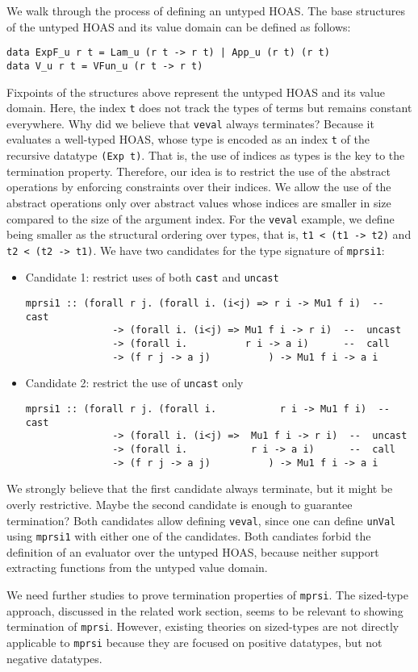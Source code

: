 We walk through the process of defining an untyped HOAS.
The base structures of the untyped HOAS and its value domain
can be defined as follows:
\begin{lstlisting}
data ExpF_u r t = Lam_u (r t -> r t) | App_u (r t) (r t)
data V_u r t = VFun_u (r t -> r t)
\end{lstlisting}
Fixpoints of the structures above represent the untyped HOAS and
its value domain. Here, the index \lstinline{t} does not track
the types of terms but remains constant everywhere.
Why did we believe that \lstinline{veval} always terminates?
Because it evaluates a well-typed HOAS, whose type is encoded as
an index \lstinline{t} of the recursive datatype \lstinline{(Exp t)}. That is,
the use of indices as types is the key to the termination property.
Therefore, our idea is to restrict the use of the abstract operations
by enforcing constraints over their indices. We allow the use
of the abstract operations only over abstract values whose indices are
smaller in size compared to the size of the argument index.
For the \lstinline{veval} example, we define being smaller as
the structural ordering over types, that is, \lstinline{t1 < (t1 -> t2)}
and \lstinline{t2 < (t2 -> t1)}.
We have two candidates for the type signature of \lstinline{mprsi1}:
\begin{itemize}
\item Candidate 1: restrict uses of both \lstinline{cast} and \lstinline{uncast}
\begin{lstlisting}
mprsi1 :: (forall r j. (forall i. (i<j) => r i -> Mu1 f i)  --  cast
               -> (forall i. (i<j) => Mu1 f i -> r i)  --  uncast
               -> (forall i.          r i -> a i)      --  call
               -> (f r j -> a j)          ) -> Mu1 f i -> a i
\end{lstlisting}
\item Candidate 2: restrict the use of \lstinline{uncast} only
\begin{lstlisting}
mprsi1 :: (forall r j. (forall i.           r i -> Mu1 f i)  --  cast
               -> (forall i. (i<j) =>  Mu1 f i -> r i)  --  uncast
               -> (forall i.           r i -> a i)      --  call
               -> (f r j -> a j)          ) -> Mu1 f i -> a i
\end{lstlisting}
\end{itemize}
We strongly believe that the first candidate always terminate,
but it might be overly restrictive. Maybe the second candidate is
enough to guarantee termination? Both candidates allow defining
\lstinline{veval}, since one can define \lstinline{unVal}
using \lstinline{mprsi1} with either one of the candidates.
Both candiates forbid the definition of an evaluator over the untyped HOAS,
because neither support extracting functions from the untyped value domain.

We need further studies to prove termination properties of \lstinline{mprsi}.
The sized-type approach, discussed in the related work section,
seems to be relevant to showing termination of \lstinline{mprsi}.
However, existing theories on sized-types are not directly applicable to
\lstinline{mprsi} because they are focused on positive datatypes, but
not negative datatypes.



